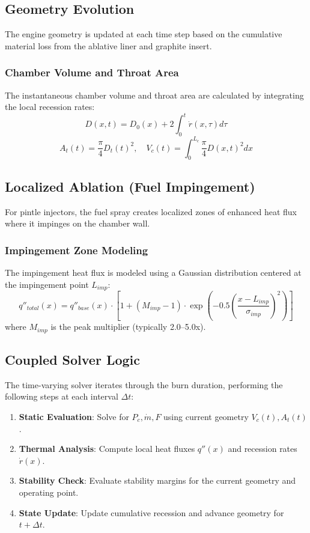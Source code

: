 \subsection{Geometry Evolution}
The engine geometry is updated at each time step based on the cumulative material loss from the ablative liner and graphite insert.

\subsubsection{Chamber Volume and Throat Area}
The instantaneous chamber volume and throat area are calculated by integrating the local recession rates:
\begin{equation}
D(x, t) = D_0(x) + 2 \int_0^t \dot{r}(x, \tau) d\tau
\end{equation}
\begin{equation}
A_t(t) = \frac{\pi}{4} D_t(t)^2, \quad V_c(t) = \int_0^{L_c} \frac{\pi}{4} D(x, t)^2 dx
\end{equation}

\subsection{Localized Ablation (Fuel Impingement)}
For pintle injectors, the fuel spray creates localized zones of enhanced heat flux where it impinges on the chamber wall.

\subsubsection{Impingement Zone Modeling}
The impingement heat flux is modeled using a Gaussian distribution centered at the impingement point $L_{imp}$:
\begin{equation}
q''_{total}(x) = q''_{base}(x) \cdot \left[1 + (M_{imp} - 1) \cdot \exp\left(-0.5 \left(\frac{x - L_{imp}}{\sigma_{imp}}\right)^2\right)\right]
\end{equation}
where $M_{imp}$ is the peak multiplier (typically 2.0--5.0x).

\subsection{Coupled Solver Logic}
The time-varying solver iterates through the burn duration, performing the following steps at each interval $\Delta t$:
\begin{enumerate}
    \item \textbf{Static Evaluation}: Solve for $P_c, \dot{m}, F$ using current geometry $V_c(t), A_t(t)$.
    \item \textbf{Thermal Analysis}: Compute local heat fluxes $q''(x)$ and recession rates $\dot{r}(x)$.
    \item \textbf{Stability Check}: Evaluate stability margins for the current geometry and operating point.
    \item \textbf{State Update}: Update cumulative recession and advance geometry for $t + \Delta t$.
\end{enumerate}

